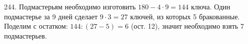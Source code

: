 244. Подмастерьям необходимо изготовить $180-4\cdot9=144$ ключа. Один подмастерье за 9 дней сделает $9\cdot3=27$ ключей, из которых 5 бракованные. Поделим с остатком: $144:(27-5)=6$ (ост. 12), значит необходимо взять 7 подмастерьев.\\

